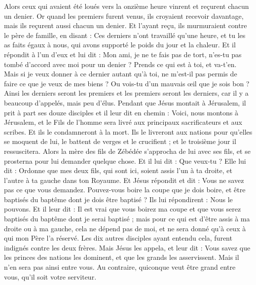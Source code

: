 \begin{multicols}{2}
Alors ceux qui avaient été loués vers la onzième heure vinrent et reçurent chacun un denier.
Or quand les premiers furent venus, ils croyaient recevoir davantage, mais ils reçurent aussi chacun un denier.
Et l'ayant reçu, ils murmuraient contre le père de famille,
en disant : Ces derniers n'ont travaillé qu'une heure, et tu les as faits égaux à nous, qui avons supporté le poids du jour et la chaleur.
Et il répondit à l'un d'eux et lui dit : Mon ami, je ne te fais pas de tort, n'es-tu pas tombé d'accord avec moi pour un denier ?
Prends ce qui est à toi, et va-t'en. Mais si je veux donner à ce dernier autant qu'à toi,
ne m'est-il pas permis de faire ce que je veux de mes biens ? Ou vois-tu d'un mauvais œil que je sois bon ?
Ainsi les derniers seront les premiers et les premiers seront les derniers, car il y a beaucoup d'appelés, mais peu d'élus.
Pendant que Jésus montait à Jérusalem, il prit à part ses douze disciples et il leur dit en chemin :
Voici, nous montons à Jérusalem, et le Fils de l'homme sera livré aux principaux sacrificateurs et aux scribes. Et ils le condamneront à la mort.
Ils le livreront aux nations pour qu'elles se moquent de lui, le battent de verges et le crucifient ; et le troisième jour il ressuscitera.
Alors la mère des fils de Zébédée s'approcha de lui avec ses fils, et se prosterna pour lui demander quelque chose.
Et il lui dit : Que veux-tu ? Elle lui dit : Ordonne que mes deux fils, qui sont ici, soient assis l'un à ta droite, et l'autre à ta gauche dans ton Royaume.
Et Jésus répondit et dit : Vous ne savez pas ce que vous demandez. Pouvez-vous boire la coupe que je dois boire, et être baptisés du baptême dont je dois être baptisé ? Ils lui répondirent : Nous le pouvons.
Et il leur dit : Il est vrai que vous boirez ma coupe et que vous serez baptisés du baptême dont je serai baptisé ; mais pour ce qui est d'être assis à ma droite ou à ma gauche, cela ne dépend pas de moi, et ne sera donné qu'à ceux à qui mon Père l'a réservé.
Les dix autres disciples ayant entendu cela, furent indignés contre les deux frères.
Mais Jésus les appela, et leur dit : Vous savez que les princes des nations les dominent, et que les grands les asservissent.
Mais il n'en sera pas ainsi entre vous. Au contraire, quiconque veut être grand entre vous, qu'il soit votre serviteur.

\end{multicols}
